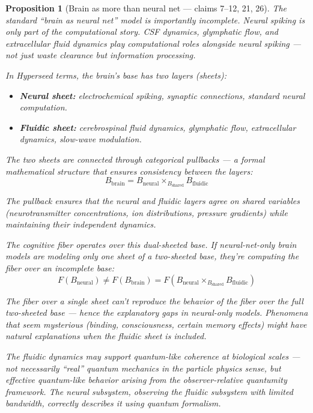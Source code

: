 \documentclass[11pt,a4paper]{article}
\newtheorem{proposition}[definition]{Proposition}
\begin{document}
\begin{proposition}[Brain as more than neural net --- claims 7--12, 21, 26]
\label{prop:brain}
The standard ``brain as neural net'' model is importantly incomplete.
Neural spiking is only part of the computational story. CSF dynamics,
glymphatic flow, and extracellular fluid dynamics play computational
roles alongside neural spiking --- not just waste clearance but
information processing.

In Hyperseed terms, the brain's base has two layers (sheets):
\begin{itemize}
\item \textbf{Neural sheet:} electrochemical spiking, synaptic
  connections, standard neural computation.
\item \textbf{Fluidic sheet:} cerebrospinal fluid dynamics, glymphatic
  flow, extracellular dynamics, slow-wave modulation.
\end{itemize}

The two sheets are connected through categorical pullbacks --- a formal
mathematical structure that ensures consistency between the layers:
\[
  B_{\text{brain}} = B_{\text{neural}} \times_{B_{\text{shared}}}
  B_{\text{fluidic}}
\]

The pullback ensures that the neural and fluidic layers agree on shared
variables (neurotransmitter concentrations, ion distributions, pressure
gradients) while maintaining their independent dynamics.

The cognitive fiber operates over this dual-sheeted base. If neural-net-only
brain models are modeling only one sheet of a two-sheeted base, they're
computing the fiber over an incomplete base:
\[
  F(B_{\text{neural}}) \neq F(B_{\text{brain}}) =
  F(B_{\text{neural}} \times_{B_{\text{shared}}} B_{\text{fluidic}})
\]

The fiber over a single sheet can't reproduce the behavior of the fiber
over the full two-sheeted base --- hence the explanatory gaps in
neural-only models. Phenomena that seem mysterious (binding, consciousness,
certain memory effects) might have natural explanations when the fluidic
sheet is included.

The fluidic dynamics may support quantum-like coherence at biological
scales --- not necessarily ``real'' quantum mechanics in the particle
physics sense, but effective quantum-like behavior arising from the
observer-relative quantumity framework. The neural subsystem, observing
the fluidic subsystem with limited bandwidth, correctly describes it
using quantum formalism.
\end{proposition}
\end{document}
